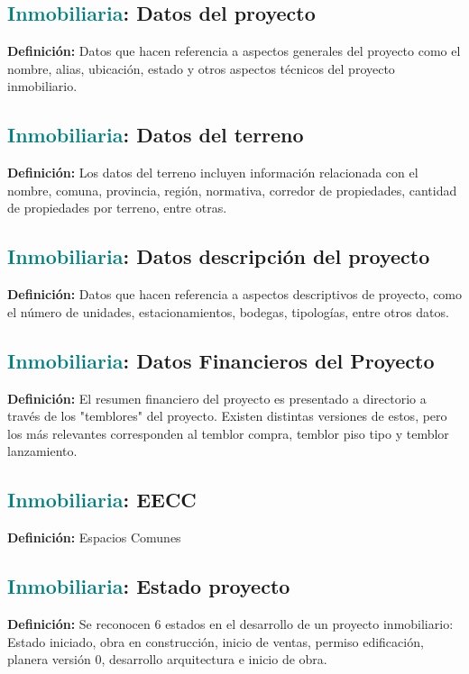 \documentclass[12pt]{article}
\begin{document}
\subsection{\textcolor{teal}{Inmobiliaria}: Datos del proyecto}
\textbf{Definición:} Datos que hacen referencia a aspectos generales del proyecto como el nombre, alias, ubicación, estado y otros aspectos técnicos del proyecto inmobiliario.
\subsection{\textcolor{teal}{Inmobiliaria}: Datos del terreno}
\textbf{Definición:} Los datos del terreno incluyen información relacionada con el nombre, comuna, provincia, región, normativa, corredor de propiedades, cantidad de propiedades por terreno, entre otras.
\subsection{\textcolor{teal}{Inmobiliaria}: Datos descripción del proyecto}
\textbf{Definición:} Datos que hacen referencia a aspectos descriptivos de proyecto, como el número de unidades, estacionamientos, bodegas, tipologías, entre otros datos.
\subsection{\textcolor{teal}{Inmobiliaria}: Datos Financieros del Proyecto}
\textbf{Definición:} El resumen financiero del proyecto es presentado a directorio a través de los "temblores" del proyecto. Existen distintas versiones de estos, pero los más relevantes corresponden al temblor compra, temblor piso tipo y temblor lanzamiento.
\subsection{\textcolor{teal}{Inmobiliaria}: EECC}
\textbf{Definición:} Espacios Comunes
\subsection{\textcolor{teal}{Inmobiliaria}: Estado proyecto}
\textbf{Definición:} Se reconocen 6 estados en el desarrollo de un proyecto inmobiliario: Estado iniciado, obra en construcción, inicio de ventas, permiso edificación, planera versión 0, desarrollo arquitectura e inicio de obra.
\end{document}
